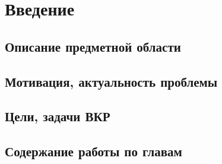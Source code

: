 \newpage
\section*{Введение}
\subsection*{Описание предметной области}
\subsection*{Мотивация, актуальность проблемы}
\subsection*{Цели, задачи ВКР}
\subsection*{Содержание работы по главам}
